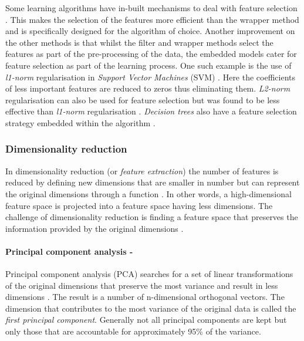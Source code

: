 \documentclass{article}[paper=a4,pagesize=auto,10pt]
\begin{document}
Some learning algorithms have in-built mechanisms to deal with feature selection \cite{guyon2003introduction,sammut2017encyclopedia}. This makes the selection of the features more efficient than the wrapper method and is specifically designed for the algorithm of choice. Another improvement on the other methods is that whilst the filter and wrapper methods select the features as part of the pre-processing of the data, the embedded models cater for feature selection as part of the learning process. One such example is the use of \textit{l1-norm} regularisation in \textit{Support Vector Machines} (SVM) \cite{guyon2003introduction,de2015feature}. Here the coefficients of less important features are reduced to zeros thus eliminating them. \textit{L2-norm} regularisation can also be used for feature selection but was found to be less effective than \textit{l1-norm} regularisation \cite{de2015feature}. \textit{Decision trees} also have a feature selection strategy embedded within the algorithm \cite{garcia2015data}.

\subsubsection{Dimensionality reduction} \label{Dimensionality reduction}

In dimensionality reduction (or \textit{feature extraction}) the number of features is reduced by defining new dimensions that are smaller in number but can represent the original dimensions through a function \cite{garcia2015data,sammut2017encyclopedia}. In other words, a high-dimensional feature space is projected into a feature space having less dimensions. The challenge of dimensionality reduction is finding a feature space that preserves the information provided by the original dimensions \cite{sammut2017encyclopedia}.

\paragraph{Principal component analysis -}

Principal component analysis (PCA) searches for a set of linear transformations of the original dimensions that preserve the most variance and result in less dimensions \cite{garcia2015data}. The result is a number of n-dimensional orthogonal vectors. The dimension that contributes to the most variance of the original data is called the \textit{first principal component}. Generally not all principal components are kept but only those that are accountable for approximately 95\% of the variance.
\end{document}
